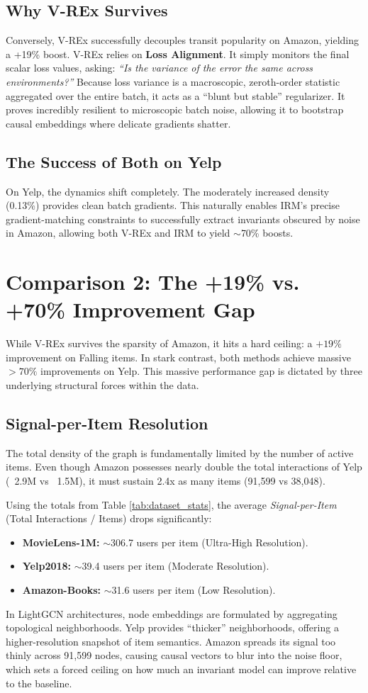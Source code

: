 \documentclass{article}
\begin{document}
\subsection{Why V-REx Survives}
Conversely, V-REx successfully decouples transit popularity on Amazon, yielding a +19\% boost. V-REx relies on \textbf{Loss Alignment}. It simply monitors the final scalar loss values, asking: \textit{``Is the variance of the error the same across environments?''} Because loss variance is a macroscopic, zeroth-order statistic aggregated over the entire batch, it acts as a ``blunt but stable'' regularizer. It proves incredibly resilient to microscopic batch noise, allowing it to bootstrap causal embeddings where delicate gradients shatter.

\subsection{The Success of Both on Yelp}
On Yelp, the dynamics shift completely. The moderately increased density (0.13\%) provides clean batch gradients. This naturally enables IRM's precise gradient-matching constraints to successfully extract invariants obscured by noise in Amazon, allowing both V-REx and IRM to yield $\sim$70\% boosts.

\section{Comparison 2: The +19\% vs. +70\% Improvement Gap}
While V-REx survives the sparsity of Amazon, it hits a hard ceiling: a $+19\%$ improvement on Falling items. In stark contrast, both methods achieve massive $>70\%$ improvements on Yelp. This massive performance gap is dictated by three underlying structural forces within the data.

\subsection{Signal-per-Item Resolution}
The total density of the graph is fundamentally limited by the number of active items. Even though Amazon possesses nearly double the total interactions of Yelp (~2.9M vs ~1.5M), it must sustain 2.4x as many items (91,599 vs 38,048). 

Using the totals from Table \ref{tab:dataset_stats}, the average \textit{Signal-per-Item} (Total Interactions / Items) drops significantly:
\begin{itemize}
    \item \textbf{MovieLens-1M:} $\sim$306.7 users per item (Ultra-High Resolution).
    \item \textbf{Yelp2018:} $\sim$39.4 users per item (Moderate Resolution).
    \item \textbf{Amazon-Books:} $\sim$31.6 users per item (Low Resolution).
\end{itemize}
In LightGCN architectures, node embeddings are formulated by aggregating topological neighborhoods. Yelp provides ``thicker'' neighborhoods, offering a higher-resolution snapshot of item semantics. Amazon spreads its signal too thinly across 91,599 nodes, causing causal vectors to blur into the noise floor, which sets a forced ceiling on how much an invariant model can improve relative to the baseline.
\end{document}
